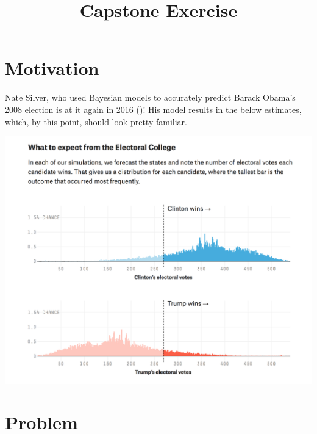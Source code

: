 \documentclass[12pt, oneside]{article}
\title{\vspace{-1cm}Capstone Exercise}
\newcommand{\link}[3][blue]{\href{#2}{\color{#1}{#3}}}%
\begin{document}
\maketitle

\thispagestyle{fancy}

\section*{Motivation}
Nate Silver, who used Bayesian models to accurately predict Barack Obama's 2008 election is at it again in 2016 (\link{http://fivethirtyeight.com/features/a-users-guide-to-fivethirtyeights-2016-general-election-forecast/}{official methods link})!  His model results in the below estimates, which, by this point, should look pretty familiar.  
\vspace{5mm}
\begin{center}
\includegraphics[scale=.5]{HillzPosteriorsYo.png}
\end{center}

\newpage

\section*{Problem}
\end{document}
